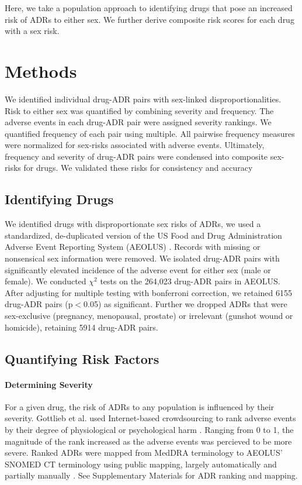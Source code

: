 \documentclass[11pt, oneside]{article}
\begin{document}
Here, we take a population approach to identifying drugs that pose an increased risk of ADRs to either sex. We further derive composite risk scores for each drug with a sex risk.

\section{Methods}

We identified individual drug-ADR pairs with sex-linked disproportionalities. Risk to either sex was quantified by combining severity and frequency. The adverse events in each drug-ADR pair were assigned severity rankings. We quantified frequency of each pair using multiple. All pairwise frequency measures were normalized for sex-risks associated with adverse events. Ultimately, frequency and severity of drug-ADR pairs were condensed into composite sex-risks for drugs. We validated these risks for consistency and accuracy 

\subsection{Identifying Drugs}

We identified drugs with disproportionate sex risks of ADRs, we used a standardized, de-duplicated version of the US Food and Drug Administration Adverse Event Reporting System (AEOLUS) \cite{banda_curated_2016}. Records with missing or nonsensical sex information were removed. We isolated drug-ADR pairs with significantly elevated incidence of the adverse event for either sex (male or female). We conducted $\chi^2$ tests on the 264,023 drug-ADR pairs in AEOLUS. After adjusting for multiple testing with bonferroni correction, we retained 6155 drug-ADR pairs (p$<$0.05) as significant. Further we dropped ADRs that were sex-exclusive (pregnancy,  menopausal, prostate) or irrelevant (gunshot wound or homicide), retaining 5914 drug-ADR pairs. 

\subsection{Quantifying Risk Factors}

\paragraph{Determining Severity}

For a given drug, the risk of ADRs to any population is influenced by their severity. Gottlieb et al. used Internet-based crowdsourcing to rank adverse events by their degree of physiological or psychological harm \cite{gottlieb_ranking_2015}. Ranging from 0 to 1, the magnitude of the rank increased as the adverse events was percieved to be more severe. Ranked ADRs were mapped from MedDRA terminology to AEOLUS' SNOMED CT terminology using public mapping, largely automatically and partially manually \cite{boyce_bridging_2014}. See Supplementary Materials for ADR ranking and mapping. 
\end{document}
